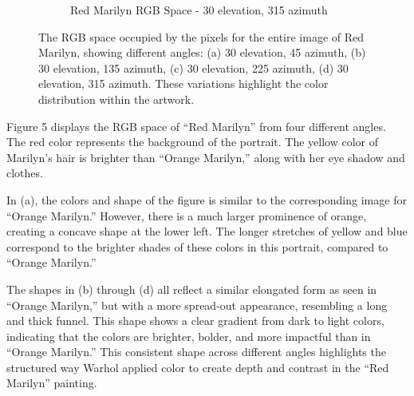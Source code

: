 \documentclass{article}
\begin{document}
\begin{figure}[ht]
\begin{subfigure}{0.45\textwidth}
    \caption{Red Marilyn RGB Space - 30 \degree elevation, 315 \degree azimuth}
    \label{fig:4_8_red_marilyn_original_scatter}
  \end{subfigure}
  \caption{The RGB space occupied by the pixels for the entire image of Red Marilyn, showing different angles: (a) 30 \degree elevation, 45 \degree azimuth, (b) 30 \degree elevation, 135 \degree azimuth, (c) 30 \degree elevation, 225 \degree azimuth, (d) 30 \degree elevation, 315 \degree azimuth. These variations highlight the color distribution within the artwork.}
  \label{fig:red_marilyn_original_scatter_2}
\end{figure}

Figure 5 displays the RGB space of ``Red Marilyn'' from four different
angles. The red color represents the background of the portrait. The
yellow color of Marilyn's hair is brighter than ``Orange Marilyn,''
along with her eye shadow and clothes.

In (a), the colors and shape of the figure is similar to the
corresponding image for ``Orange Marilyn.'' However, there is a much
larger prominence of orange, creating a concave shape at the lower left.
The longer stretches of yellow and blue correspond to the brighter
shades of these colors in this portrait, compared to ``Orange Marilyn.''

The shapes in (b) through (d) all reflect a similar elongated form as
seen in ``Orange Marilyn,'' but with a more spread-out appearance,
resembling a long and thick funnel. This shape shows a clear gradient
from dark to light colors, indicating that the colors are brighter,
bolder, and more impactful than in ``Orange Marilyn.'' This consistent
shape across different angles highlights the structured way Warhol
applied color to create depth and contrast in the ``Red Marilyn''
painting.
\end{document}
